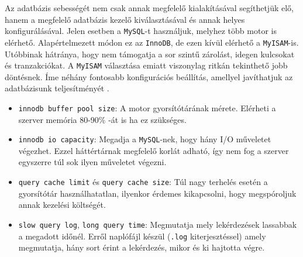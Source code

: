 Az adatbázis sebességét nem csak annak megfelelő kialakításával segíthetjük elő, hanem a megfelelő adatbázis kezelő kiválasztásával és annak helyes konfigurálásával.
Jelen esetben a \texttt{MySQL}-t használjuk, melyhez több motor is elérhető. Alapértelmezett módon ez az \texttt{InnoDB}, de ezen kívül elérhető a \texttt{MyISAM}-is. Utóbbinak hátránya, hogy nem támogatja a sor szintű zárolást, idegen kulcsokat és tranzakciókat. A \texttt{MyISAM} választása emiatt viszonylag ritkán tekinthető jobb döntésnek. Íme néhány fontosabb konfigurációs beállítás, amellyel javíthatjuk az adatbázisunk teljesítményét \cite{other_optimization}.
\begin{itemize}
\item \texttt{innodb buffer pool size}: A motor gyorsítótárának mérete. Elérheti a szerver memória 80-90\% -át is ha ez szükséges.
\item \texttt{innodb io capacity}: Megadja a \texttt{MySQL}-nek, hogy hány I/O műveletet végezhet. Ezzel háttértárnak megfelelő korlát adható, így nem fog a szerver  egyszerre túl sok ilyen műveletet végezni.
\item \texttt{query cache limit} és \texttt{query cache size}: Túl nagy terhelés esetén a gyorsítótár használhatatlan, ilyenkor érdemes kikapcsolni, hogy megspóroljuk annak kezelési költségét.
\item \texttt{slow query log}, \texttt{long query time}: Megmutatja mely lekérdezések lassabbak a megadott időnél. Erről naplófájl készül (\texttt{.log} kiterjesztéssel) amely megmutatja, hány sort érint a lekérdezés, mikor és ki hajtotta végre.
\end{itemize}
